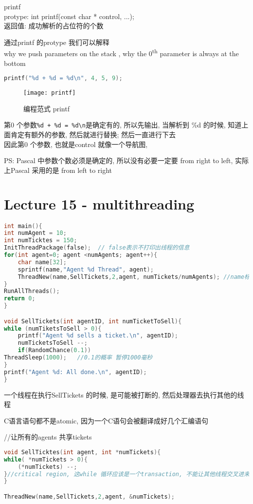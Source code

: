 \documentclass{article}
\begin{document}
printf\\
protype:	int printf(const char * control, ...);\\
返回值: 成功解析的占位符的个数

通过printf 的protype 我们可以解释\\
why we push parameters on the stack , why the $0$\textsuperscript{th} parameter is always at the bottom

\begin{lstlisting}[language = C]
printf("%d + %d = %d\n", 4, 5, 9);
\end{lstlisting}
\begin{figure}[htbp]
	\centering
	\texttt{[image: printf]}\\
	\caption{编程范式 printf}\label{fig.printf}
\end{figure}

第0 个参数\verb "%d + %
因此第0 个参数, 也就是control 就像一个导航图,

PS: Pascal 中参数个数必须是确定的, 所以没有必要一定要 from right to left, 实际上Pascal 采用的是 from left to right

\section{Lecture 15 - multithreading}
\begin{lstlisting}[language = C]
int main(){
int numAgent = 10;
int numTicktes = 150;
InitThreadPackage(false);  // false表示不打印出线程的信息
for(int agent=0; agent <numAgents; agent++){
	char name[32];
	sprintf(name,"Agent %d Thread", agent);
	ThreadNew(name,SellTickets,2,agent, numTickets/numAgents); //name标记不同的线程
}
RunAllThreads();
return 0;
}

void SellTickets(int agentID, int numTicketToSell){
while (numTiketsToSell > 0){
	printf("Agent %d sells a ticket.\n", agentID);
	numTicketsToSell --;
	if(RandomChance(0.1))
ThreadSleep(1000);	 //0.1的概率 暂停1000毫秒
}
printf("Agent %d: All done.\n", agentID);
}
\end{lstlisting}
一个线程在执行SellTickets 的时候, 是可能被打断的, 然后处理器去执行其他的线程

C语言语句都不是atomic, 因为一个C语句会被翻译成好几个汇编语句

//让所有的agents 共享tickets
\begin{lstlisting}[language = C]
void SellTicktes(int agent, int *numTickets){
while( *numTickets > 0){
	(*numTickets) --;
}//critical region, 这while 循环应该是一个transaction, 不能让其他线程交叉进来
}

ThreadNew(name,SellTickets,2,agent, &numTickets);
\end{lstlisting}
\end{document}
